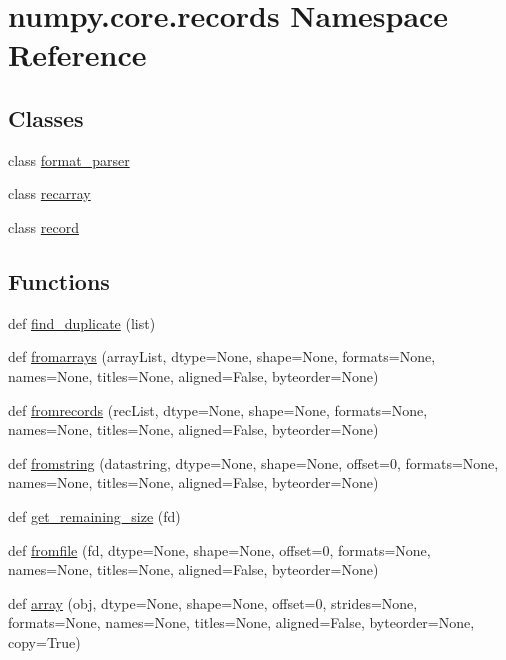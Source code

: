 \hypertarget{namespacenumpy_1_1core_1_1records}{}\section{numpy.\+core.\+records Namespace Reference}
\label{namespacenumpy_1_1core_1_1records}
\subsection*{Classes}
\begin{DoxyCompactItemize}
\item 
class \hyperlink{classnumpy_1_1core_1_1records_1_1format__parser}{format\+\_\+parser}
\item 
class \hyperlink{classnumpy_1_1core_1_1records_1_1recarray}{recarray}
\item 
class \hyperlink{classnumpy_1_1core_1_1records_1_1record}{record}
\end{DoxyCompactItemize}
\subsection*{Functions}
\begin{DoxyCompactItemize}
\item 
def \hyperlink{namespacenumpy_1_1core_1_1records_ad7a3634fa20117393946ae437544bfcf}{find\+\_\+duplicate} (list)
\item 
def \hyperlink{namespacenumpy_1_1core_1_1records_ad87b52d2052c1c40fb033acfb1e2c19b}{fromarrays} (array\+List, dtype=None, shape=None, formats=None, names=None, titles=None, aligned=False, byteorder=None)
\item 
def \hyperlink{namespacenumpy_1_1core_1_1records_a79c421917f1afc5684031b61d544ce0b}{fromrecords} (rec\+List, dtype=None, shape=None, formats=None, names=None, titles=None, aligned=False, byteorder=None)
\item 
def \hyperlink{namespacenumpy_1_1core_1_1records_a00058e350d76ecfea2c90d0c564b723c}{fromstring} (datastring, dtype=None, shape=None, offset=0, formats=None, names=None, titles=None, aligned=False, byteorder=None)
\item 
def \hyperlink{namespacenumpy_1_1core_1_1records_a0467f6e94bff0117237f78b014391346}{get\+\_\+remaining\+\_\+size} (fd)
\item 
def \hyperlink{namespacenumpy_1_1core_1_1records_ae8bc3a4297648b09a7b2b82af1c5d311}{fromfile} (fd, dtype=None, shape=None, offset=0, formats=None, names=None, titles=None, aligned=False, byteorder=None)
\item 
def \hyperlink{namespacenumpy_1_1core_1_1records_a19d473bb11a2a4e0f1a677a0981313d2}{array} (obj, dtype=None, shape=None, offset=0, strides=None, formats=None, names=None, titles=None, aligned=False, byteorder=None, copy=True)
\end{DoxyCompactItemize}
